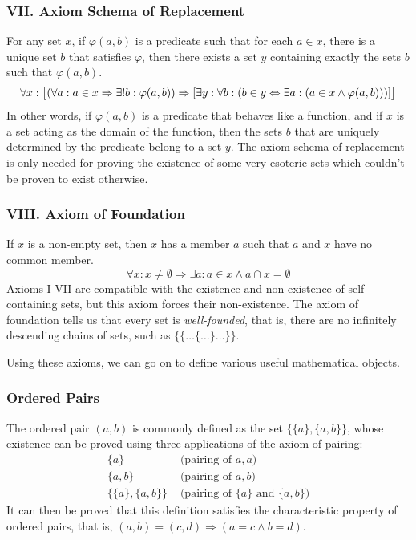 \documentclass[11pt]{report}
\theoremstyle{definition}
\theoremstyle{theorem}
\theoremstyle{lemma}
\begin{document}
\subsubsection*{VII. Axiom Schema of Replacement}
For any set $x$, if $\varphi(a,b)$ is a predicate such that for each $a\in x$, there is a unique set $b$ that satisfies $\varphi$, then there exists a set $y$ containing exactly the sets $b$ such that $\varphi(a,b)$.
$$\forall x: \big{[}(\forall a: a\in x \Rightarrow \exists! b: \varphi(a,b))
  \Rightarrow [\exists y: \forall b: (b \in y \Leftrightarrow \exists a: (a\in x \wedge \varphi(a,b)))]\big{]}$$
In other words, if $\varphi(a,b)$ is a predicate that behaves like a function, and if $x$ is a set acting as the domain of the function, then the sets $b$ that are uniquely determined by the predicate belong to a set $y$.
The axiom schema of replacement is only needed for proving the existence of some very esoteric sets which couldn't be proven to exist otherwise. 

\subsubsection*{VIII. Axiom of Foundation}
If $x$ is a non-empty set, then $x$ has a member $a$ such that $a$ and $x$ have no common member.
$$\forall x: x \neq \emptyset \Rightarrow \exists a: a\in x \wedge a \cap x = \emptyset$$
Axioms I-VII are compatible with the existence and non-existence of self-containing sets, but this axiom forces their non-existence. The axiom of foundation tells us that every set is \emph{well-founded}, that is, there are no infinitely descending chains of sets, such as $\{\{\ldots\{\ldots\}\ldots\}\}$.

Using these axioms, we can go on to define various useful mathematical objects.

\subsubsection*{Ordered Pairs}
The ordered pair $(a,b)$ is commonly defined as the set $\{\{a\},\{a,b\}\}$, whose existence can be proved using three applications of the axiom of pairing:
\begin{align*}
  \{a\} & \text{  (pairing of $a,a$)} \\
  \{a,b\} & \text{  (pairing of $a,b$)} \\
  \{\{a\}, \{a,b\}\} & \text{  (pairing of $\{a\}$ and $\{a,b\}$)}
\end{align*}
It can then be proved that this definition satisfies the characteristic property of ordered pairs, that is, $(a,b) = (c,d) \Rightarrow (a=c \wedge b=d)$.
\end{document}
